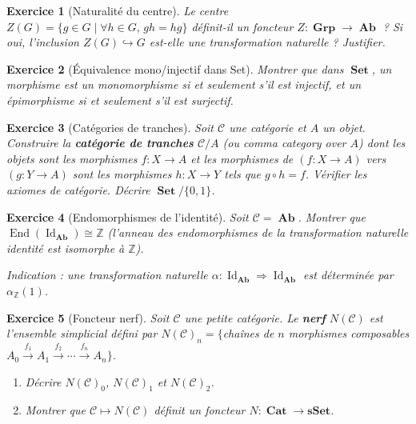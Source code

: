 \documentclass[a4paper,12pt]{book}
\DeclareMathOperator{\End}{End}
\DeclareMathOperator{\Id}{Id}
\DeclareMathOperator{\Set}{\mathbf{Set}}
\DeclareMathOperator{\Grp}{\mathbf{Grp}}
\DeclareMathOperator{\Ab}{\mathbf{Ab}}
\DeclareMathOperator{\Cat}{\mathbf{Cat}}
\newcommand{\Z}{\mathbb{Z}}
\newtheorem{exercice}{Exercice}[chapter]
\begin{document}
\begin{exercice}[Naturalité du centre]\label{exo:centre}
Le centre $Z(G) = \{g \in G \mid \forall h \in G,\, gh = hg\}$ définit-il un foncteur $Z : \Grp \to \Ab$ ? Si oui, l'inclusion $Z(G) \hookrightarrow G$ est-elle une transformation naturelle ? Justifier.
\end{exercice}

\begin{exercice}[Équivalence mono/injectif dans Set]\label{exo:mono-set}
Montrer que dans $\Set$, un morphisme est un monomorphisme si et seulement s'il est injectif, et un épimorphisme si et seulement s'il est surjectif.
\end{exercice}

\begin{exercice}[Catégories de tranches]\label{exo:tranche}
Soit $\mathcal{C}$ une catégorie et $A$ un objet. Construire la \textbf{catégorie de tranches} $\mathcal{C}/A$ (ou \emph{comma category over $A$}) dont les objets sont les morphismes $f : X \to A$ et les morphismes de $(f : X \to A)$ vers $(g : Y \to A)$ sont les morphismes $h : X \to Y$ tels que $g \circ h = f$. Vérifier les axiomes de catégorie. Décrire $\Set/\{0,1\}$.
\end{exercice}

\begin{exercice}[Endomorphismes de l'identité]\label{exo:endo-id}
Soit $\mathcal{C} = \Ab$. Montrer que $\End({\Id_{\Ab}}) \cong \Z$ (l'anneau des endomorphismes de la transformation naturelle identité est isomorphe à $\Z$).

\emph{Indication} : une transformation naturelle $\alpha : \Id_{\Ab} \Rightarrow \Id_{\Ab}$ est déterminée par $\alpha_\Z(1)$.
\end{exercice}

\begin{exercice}[Foncteur nerf]\label{exo:nerf}
Soit $\mathcal{C}$ une petite catégorie. Le \textbf{nerf} $N(\mathcal{C})$ est l'ensemble simplicial défini par $N(\mathcal{C})_n = \{$chaînes de $n$ morphismes composables $A_0 \xrightarrow{f_1} A_1 \xrightarrow{f_2} \cdots \xrightarrow{f_n} A_n\}$.
\begin{enumerate}[label=(\alph*)]
  \item Décrire $N(\mathcal{C})_0$, $N(\mathcal{C})_1$ et $N(\mathcal{C})_2$.
  \item Montrer que $\mathcal{C} \mapsto N(\mathcal{C})$ définit un foncteur $N : \Cat \to \mathbf{sSet}$.
\end{enumerate}
\end{exercice}
\end{document}
